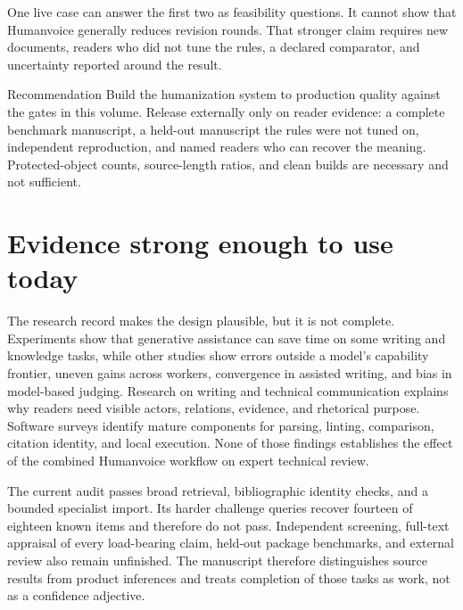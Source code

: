 One live case can answer the first two as feasibility questions. It cannot
show that Humanvoice generally reduces revision rounds. That stronger claim
requires new documents, readers who did not tune the rules, a declared
comparator, and uncertainty reported around the result.

\begin{decisionbox}{Recommendation}
Build the humanization system to production quality against the gates in this
volume. Release externally only on reader evidence: a complete benchmark
manuscript, a held-out manuscript the rules were not tuned on, independent
reproduction, and named readers who can recover the meaning. Protected-object
counts, source-length ratios, and clean builds are necessary and not sufficient.
\end{decisionbox}

\section*{Evidence strong enough to use today}

The research record makes the design plausible, but it is not complete.
Experiments show that generative assistance can save time on some writing and
knowledge tasks, while other studies show errors outside a model's capability
frontier, uneven gains across workers, convergence in assisted writing, and
bias in model-based judging. Research on writing and technical communication
explains why readers need visible actors, relations, evidence, and rhetorical
purpose. Software surveys identify mature components for parsing, linting,
comparison, citation identity, and local execution. None of those findings
establishes the effect of the combined Humanvoice workflow on expert technical
review.

The current audit passes broad retrieval, bibliographic identity checks, and a
bounded specialist import. Its harder challenge queries recover fourteen of
eighteen known items and therefore do not pass. Independent screening,
full-text appraisal of every load-bearing claim, held-out package benchmarks,
and external review also remain unfinished. The manuscript therefore
distinguishes source results from product inferences and treats completion of
those tasks as work, not as a confidence adjective.

